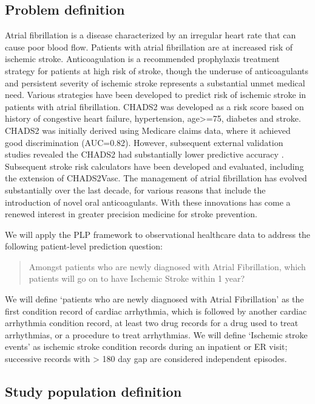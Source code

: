 \documentclass[]{book}
\begin{document}
\subsection{Problem definition}\label{problem-definition}

Atrial fibrillation is a disease characterized by an irregular heart
rate that can cause poor blood flow. Patients with atrial fibrillation
are at increased risk of ischemic stroke. Anticoagulation is a
recommended prophylaxis treatment strategy for patients at high risk of
stroke, though the underuse of anticoagulants and persistent severity of
ischemic stroke represents a substantial unmet medical need. Various
strategies have been developed to predict risk of ischemic stroke in
patients with atrial fibrillation. CHADS2 \citep{gage2001} was developed
as a risk score based on history of congestive heart failure,
hypertension, age\textgreater{}=75, diabetes and stroke. CHADS2 was
initially derived using Medicare claims data, where it achieved good
discrimination (AUC=0.82). However, subsequent external validation
studies revealed the CHADS2 had substantially lower predictive accuracy
\citep{keogh2011}. Subsequent stroke risk calculators have been
developed and evaluated, including the extension of CHADS2Vasc. The
management of atrial fibrillation has evolved substantially over the
last decade, for various reasons that include the introduction of novel
oral anticoagulants. With these innovations has come a renewed interest
in greater precision medicine for stroke prevention.

We will apply the PLP framework to observational healthcare data to
address the following patient-level prediction question:

\begin{quote}
Amongst patients who are newly diagnosed with Atrial Fibrillation, which
patients will go on to have Ischemic Stroke within 1 year?
\end{quote}

We will define `patients who are newly diagnosed with Atrial
Fibrillation' as the first condition record of cardiac arrhythmia, which
is followed by another cardiac arrhythmia condition record, at least two
drug records for a drug used to treat arrhythmias, or a procedure to
treat arrhythmias. We will define `Ischemic stroke events' as ischemic
stroke condition records during an inpatient or ER visit; successive
records with \textgreater{} 180 day gap are considered independent
episodes.

\subsection{Study population
definition}\label{study-population-definition}
\end{document}
